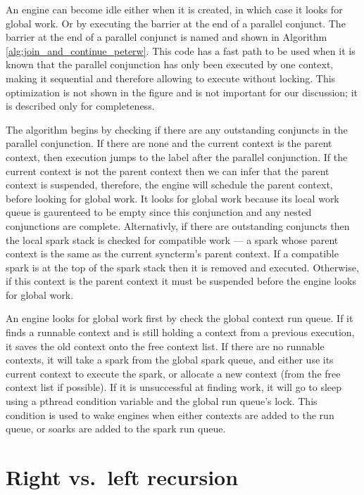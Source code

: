 An engine can become idle either when it is created,
in which case it looks for global work.
Or by executing the barrier at the end of a parallel conjunct.
The barrier at the end of a parallel conjunct 
is named {\joinandcontinue}
and shown in Algorithm \ref{alg:join_and_continue_peterw}.
This code has a fast path to be used when it is known that the parallel
conjunction has only been executed by one context,
making it sequential and therefore allowing \joinandcontinue to execute
without locking.
This optimization is not shown in the figure and is not important for our
discussion;
it is described only for completeness.

The algorithm begins by checking if there are any outstanding conjuncts in
the parallel conjunction.
If there are none and the current context is the parent
context,
then execution jumps to the label after the parallel conjunction.
If the current context is not the parent context then
we can infer that the parent context is suspended,
therefore, 
the engine will schedule the parent context, before looking for global work.
It looks for global work because its local work queue is gaurenteed to be
empty since this conjunction and any nested conjunctions are complete.
Alternativly, if there are outstanding conjuncts then
the local spark stack is checked for compatible work ---
a spark whose parent context is the same as the current syncterm's parent
context.
If a compatible spark is at the top of the spark stack then it is removed
and executed.
Otherwise,
if this context is the parent context it must be suspended
before the engine looks for global work.

An engine looks for global work first by check the global context run queue.
If it finds a runnable context and is still holding a context from a
previous execution, it saves the old context onto the free context list.
If there are no runnable contexts,
it will take a spark from the global spark queue,
and either use its current context to execute the spark,
or allocate a new context (from the free context list if possible).
If it is unsuccessful at finding work,
it will go to sleep using a pthread condition variable and the global run
queue's lock.
This condition is used to wake engines when either contexts are added to the
run queue,
or soarks are added to the spark run queue.

\section{Right vs.\ left recursion}

